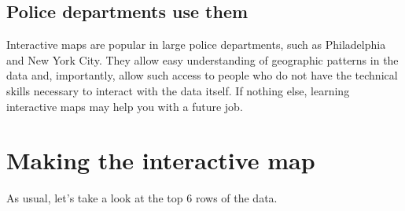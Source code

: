 \documentclass[
]{krantz}
\begin{document}
\hypertarget{police-departments-use-them}{%
\subsection{Police departments use
them}\label{police-departments-use-them}}

Interactive maps are popular in large police departments,
such as Philadelphia and New York City. They allow easy
understanding of geographic patterns in the data and,
importantly, allow such access to people who do not have the
technical skills necessary to interact with the data itself.
If nothing else, learning interactive maps may help you with
a future job.

\hypertarget{making-the-interactive-map}{%
\section{Making the interactive
map}\label{making-the-interactive-map}}

As usual, let's take a look at the top 6 rows of the data.
\end{document}
